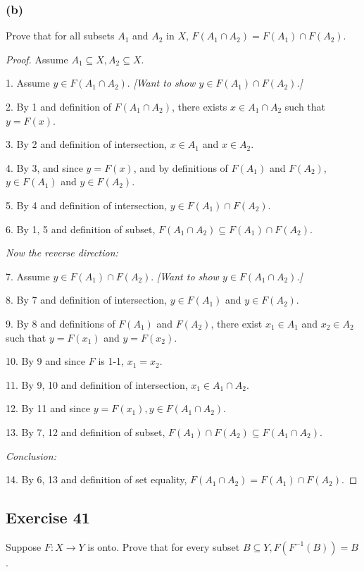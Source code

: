 \documentclass[14pt]{extarticle}
\begin{document}
\subsubsection{(b)}
Prove that for all subsets $A_1$ and $A_2$ in $X$, \(F(A_1 \cap A_2) = F(A_1) \cap F(A_2)\).

\begin{proof}
Assume \(A_1 \subseteq X, A_2 \subseteq X\).

1. Assume \(y \in F(A_1 \cap A_2)\). {\it [Want to show \(y \in F(A_1) \cap F(A_2)\).]}

2. By 1 and definition of \(F(A_1 \cap A_2)\), there exists \(x \in A_1 \cap A_2\) such that \(y = F(x)\).

3. By 2 and definition of intersection, \(x \in A_1\) and \(x \in A_2\).

4. By 3, and since $y = F(x)$, and by definitions of $F(A_1)$ and $F(A_2)$, \(y \in F(A_1)\) and \(y \in F(A_2)\).

5. By 4 and definition of intersection, \(y \in F(A_1) \cap F(A_2)\).

6. By 1, 5 and definition of subset, \(F(A_1 \cap A_2) \subseteq F(A_1) \cap F(A_2)\).

{\it Now the reverse direction:}

7. Assume \(y \in F(A_1) \cap F(A_2)\). {\it [Want to show \(y \in F(A_1 \cap A_2)\).]}

8. By 7 and definition of intersection, \(y \in F(A_1)\) and \(y \in F(A_2)\).

9. By 8 and definitions of \(F(A_1)\) and \(F(A_2)\), there exist \(x_1 \in A_1\) and \(x_2 \in A_2\) such that \(y = F(x_1)\) and \(y = F(x_2)\).

10. By 9 and since $F$ is 1-1, \(x_1 = x_2\). 

11. By 9, 10 and definition of intersection, \(x_1 \in A_1 \cap A_2\).

12. By 11 and since \(y = F(x_1), y \in F(A_1 \cap A_2)\).

13. By 7, 12 and definition of subset, \(F(A_1) \cap F(A_2) \subseteq F(A_1 \cap A_2)\).

{\it Conclusion:}

14. By 6, 13 and definition of set equality, \(F(A_1 \cap A_2) = F(A_1) \cap F(A_2)\).
\end{proof}

\subsection{Exercise 41}
Suppose \(F: X \to Y\) is onto. Prove that for every subset \(B \subseteq Y, F(F^{-1}(B)) = B\).
\end{document}
